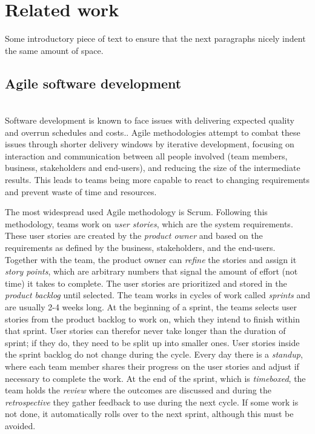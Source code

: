 \documentclass[sigconf]{acmart}
\begin{document}
\section{Related work} 
Some introductory piece of text to ensure that the next paragraphs nicely indent the same amount of space. \\

\subsection{Agile software development} \\
Software development is known to face issues with delivering expected quality and overrun schedules and costs.\cite{dingsoyr2021managing}. 
Agile methodologies attempt to combat these issues through shorter delivery windows by iterative development, focusing on interaction and communication between all people involved (team members, business, stakeholders and end-users), and reducing the size of the intermediate results. 
This leads to teams being more capable to react to changing requirements and prevent waste of time and resources.\cite{cohen2004introduction}

The most widespread used Agile methodology is Scrum\cite{deemer2010scrum}. 
Following this methodology, teams work on \emph{user stories}, which are the system requirements. 
These user stories are created by the \emph{product owner} and based on the requirements as defined by the business, stakeholders, and the end-users. 
Together with the team, the product owner can \emph{refine} the stories and assign it \emph{story points}, which are arbitrary numbers that signal the amount of effort (not time) it takes to complete. 
The user stories are prioritized and stored in the \emph{product backlog} until selected. 
The team works in cycles of work called \emph{sprints} and are usually 2-4 weeks long. 
At the beginning of a sprint, the teams selects user stories from the product backlog to work on, which they intend to finish within that sprint. 
User stories can therefor never take longer than the duration of sprint; if they do, they need to be split up into smaller ones. 
User stories inside the sprint backlog do not change during the cycle. Every day there is a \emph{standup}, where each team member shares their progress on the user stories and adjust if necessary to complete the work. 
At the end of the sprint, which is \emph{timeboxed}, the team holds the \emph{review} where the outcomes are discussed and during the \emph{retrospective } they gather feedback to use during the next cycle. 
If some work is not done, it automatically rolls over to the next sprint, although this must be avoided.
\end{document}

